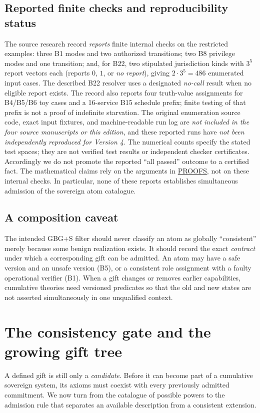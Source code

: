 \documentclass[11pt,letterpaper]{article}
\theoremstyle{definition}\newtheorem{definition}[theorem]{Definition}\newtheorem{example}[theorem]{Example}
\theoremstyle{remark}\newtheorem{remark}[theorem]{Remark}
\begin{document}
\subsection{Reported finite checks and reproducibility status}
The source research record \emph{reports} finite internal checks on the restricted examples: three B1 modes and two authorized transitions; two B8 privilege modes and one transition; and, for B22, two stipulated jurisdiction kinds with $3^5$ report vectors each (reports $0$, $1$, or \emph{no report}), giving $2\cdot3^5=486$ enumerated input cases. The described B22 resolver uses a designated \emph{no-call} result when no eligible report exists. The record also reports four truth-value assignments for B4/B5/B6 toy cases and a 16-service B15 schedule prefix; finite testing of that prefix is not a proof of indefinite starvation. The original enumeration source code, exact input fixtures, and machine-readable run log are \emph{not included in the four source manuscripts or this edition}, and these reported runs have \emph{not been independently reproduced for Version 4}. The numerical counts specify the stated test spaces; they are not verified test results or independent checker certificates. Accordingly we do not promote the reported ``all passed'' outcome to a certified fact. The mathematical claims rely on the arguments in \hyperref[w0:sec:proofs]{PROOFS}, not on these internal checks. In particular, none of these reports establishes simultaneous admission of the sovereign atom catalogue.

\subsection{A composition caveat}
The intended GBG+S filter should never classify an atom as globally ``consistent'' merely because some benign realization exists. It should record the exact \emph{contract} under which a corresponding gift can be admitted. An atom may have a safe version and an unsafe version (B5), or a consistent role assignment with a faulty operational verifier (B1). When a gift changes or removes earlier capabilities, cumulative theories need versioned predicates so that the old and new states are not asserted simultaneously in one unqualified context.


\section{The consistency gate and the growing gift tree}\label{sec:gate}
A defined gift is still only a \emph{candidate}. Before it can become part of a
cumulative sovereign system, its axioms must coexist with every previously
admitted commitment. We now turn from the catalogue of possible powers to the
admission rule that separates an available description from a consistent extension.
\end{document}
